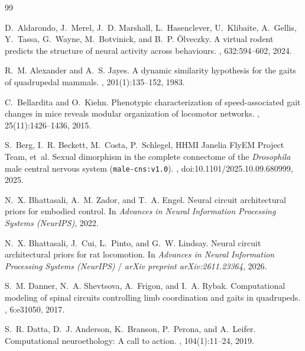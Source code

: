 \documentclass[10pt,twocolumn,letterpaper]{article}
\begin{document}
\begin{thebibliography}{99}
\setlength{\itemsep}{1.1pt}
\scriptsize

D.~Aldarondo, J.~Merel, J.~D. Marshall, L.~Hasenclever, U.~Klibaite, A.~Gellis, Y.~Tassa, G.~Wayne, M.~Botvinick, and B.~P. {\"O}lveczky.
\newblock A virtual rodent predicts the structure of neural activity across behaviours.
, 632:594--602, 2024.

R.~M. Alexander and A.~S. Jayes.
\newblock A dynamic similarity hypothesis for the gaits of quadrupedal mammals.
, 201(1):135--152, 1983.

C.~Bellardita and O.~Kiehn.
\newblock Phenotypic characterization of speed-associated gait changes in mice reveals modular organization of locomotor networks.
, 25(11):1426--1436, 2015.

S.~Berg, I.~R. Beckett, M.~Costa, P.~Schlegel, HHMI Janelia FlyEM Project Team, et~al.
\newblock Sexual dimorphism in the complete connectome of the \emph{Drosophila} male central nervous system (\texttt{male-cns:v1.0}).
, doi:10.1101/2025.10.09.680999, 2025.

N.~X. Bhattasali, A.~M. Zador, and T.~A. Engel.
\newblock Neural circuit architectural priors for embodied control.
\newblock In {\em Advances in Neural Information Processing Systems (NeurIPS)}, 2022.

N.~X. Bhattasali, J.~Cui, L.~Pinto, and G.~W. Lindsay.
\newblock Neural circuit architectural priors for rat locomotion.
\newblock In {\em Advances in Neural Information Processing Systems (NeurIPS)} / {\em arXiv preprint arXiv:2611.23364}, 2026.

S.~M. Danner, N.~A. Shevtsova, A.~Frigon, and I.~A. Rybak.
\newblock Computational modeling of spinal circuits controlling limb coordination and gaits in quadrupeds.
, 6:e31050, 2017.

S.~R. Datta, D.~J. Anderson, K.~Branson, P.~Perona, and A.~Leifer.
\newblock Computational neuroethology: A call to action.
, 104(1):11--24, 2019.


\end{thebibliography}
\end{document}

